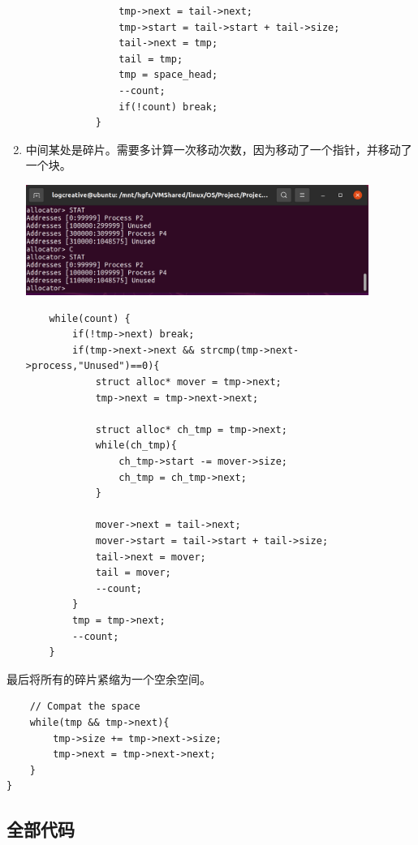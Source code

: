\documentclass[12pt,a4paper]{article}
\newenvironment{problems}{\begin{list}{}{\renewcommand{\makelabel}[1]{\textbf{##1}\hfil}}}{\end{list}}
\providecommand{\code}[2]{}
\begin{document}
\begin{problems}
\begin{enumerate}
\begin{lstlisting}
                tmp->next = tail->next;
                tmp->start = tail->start + tail->size;
                tail->next = tmp;
                tail = tmp;
                tmp = space_head;
                --count;
                if(!count) break;
            }
        \end{lstlisting}
        \item 中间某处是碎片。需要多计算一次移动次数，因为移动了一个指针，并移动了一个块。
        
        \includegraphics[width=0.88\textwidth]{C2.png}

        \begin{lstlisting}
    while(count) {
        if(!tmp->next) break;
        if(tmp->next->next && strcmp(tmp->next->process,"Unused")==0){
            struct alloc* mover = tmp->next;
            tmp->next = tmp->next->next;

            struct alloc* ch_tmp = tmp->next;
            while(ch_tmp){
                ch_tmp->start -= mover->size;
                ch_tmp = ch_tmp->next;
            }
            
            mover->next = tail->next;
            mover->start = tail->start + tail->size;
            tail->next = mover;
            tail = mover;
            --count;
        }
        tmp = tmp->next;
        --count;
    }
    \end{lstlisting}
    \end{enumerate}

    最后将所有的碎片紧缩为一个空余空间。
    \begin{lstlisting}
    // Compat the space
    while(tmp && tmp->next){
        tmp->size += tmp->next->size;
        tmp->next = tmp->next->next;
    }
}
    \end{lstlisting}

\end{problems}

\begin{appendices}
    \section{全部代码}
    \code{src/Makefile}{}
    \code{src/cma.c}{c}
\end{appendices}
\end{document}
